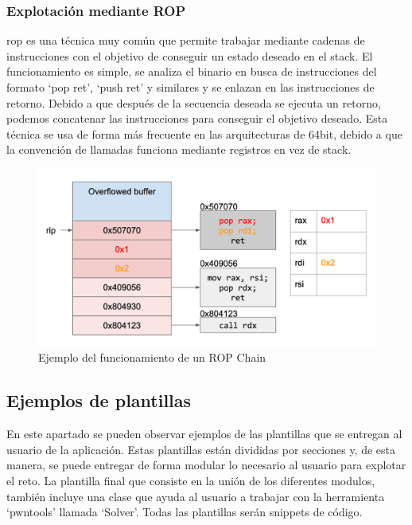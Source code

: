 \subsubsection{Explotación mediante ROP}
\acrfull{rop} es una técnica muy común que permite trabajar mediante cadenas de instrucciones con el objetivo de conseguir un estado deseado en el stack.
El funcionamiento es simple, se analiza el binario en busca de instrucciones del formato `pop ret', `push ret' y similares y se enlazan en las instrucciones de retorno.
Debido a que después de la secuencia deseada se ejecuta un retorno, podemos concatenar las instrucciones para conseguir el objetivo deseado.
Esta técnica se usa de forma más frecuente en las arquitecturas de 64bit, debido a que la convención de llamadas funciona mediante registros en vez de stack.

\FloatBarrier
\begin{figure}[htb!]
    \centering                        
    \includegraphics[width=1\textwidth]{images/rop64bit.png}
    \caption{Ejemplo del funcionamiento de un ROP Chain}
    \label{fig:ropchain}
\end{figure}
\FloatBarrier
\pagebreak

\subsection{Ejemplos de plantillas}
En este apartado se pueden observar ejemplos de las plantillas que se entregan al usuario de la aplicación.
Estas plantillas están divididas por secciones y, de esta manera, se puede entregar de forma modular lo necesario al usuario para explotar el reto.
La plantilla final que consiste en la unión de los diferentes modulos, también incluye una clase que ayuda al usuario a trabajar con la herramienta `pwntools' llamada `Solver'.
Todas las plantillas serán snippets de código.
